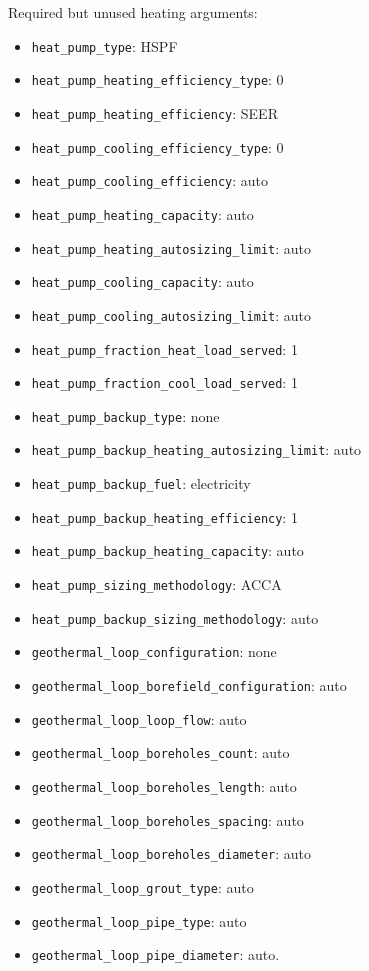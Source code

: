 Required but unused heating arguments:
\begin{itemize}
    \item \texttt{heat\_pump\_type}: HSPF
    \item \texttt{heat\_pump\_heating\_efficiency\_type}: 0
    \item \texttt{heat\_pump\_heating\_efficiency}: SEER
    \item \texttt{heat\_pump\_cooling\_efficiency\_type}: 0
    \item \texttt{heat\_pump\_cooling\_efficiency}: auto
    \item \texttt{heat\_pump\_heating\_capacity}: auto
    \item \texttt{heat\_pump\_heating\_autosizing\_limit}: auto
    \item \texttt{heat\_pump\_cooling\_capacity}: auto
    \item \texttt{heat\_pump\_cooling\_autosizing\_limit}: auto
    \item \texttt{heat\_pump\_fraction\_heat\_load\_served}: 1
    \item \texttt{heat\_pump\_fraction\_cool\_load\_served}: 1
    \item \texttt{heat\_pump\_backup\_type}: none
    \item \texttt{heat\_pump\_backup\_heating\_autosizing\_limit}: auto
    \item \texttt{heat\_pump\_backup\_fuel}: electricity
    \item \texttt{heat\_pump\_backup\_heating\_efficiency}: 1
    \item \texttt{heat\_pump\_backup\_heating\_capacity}: auto
    \item \texttt{heat\_pump\_sizing\_methodology}: ACCA
    \item \texttt{heat\_pump\_backup\_sizing\_methodology}: auto
    \item \texttt{geothermal\_loop\_configuration}: none
    \item \texttt{geothermal\_loop\_borefield\_configuration}: auto
    \item \texttt{geothermal\_loop\_loop\_flow}: auto
    \item \texttt{geothermal\_loop\_boreholes\_count}: auto
    \item \texttt{geothermal\_loop\_boreholes\_length}: auto
    \item \texttt{geothermal\_loop\_boreholes\_spacing}: auto
    \item \texttt{geothermal\_loop\_boreholes\_diameter}: auto
    \item \texttt{geothermal\_loop\_grout\_type}: auto
    \item \texttt{geothermal\_loop\_pipe\_type}: auto
    \item \texttt{geothermal\_loop\_pipe\_diameter}: auto.
\end{itemize}

